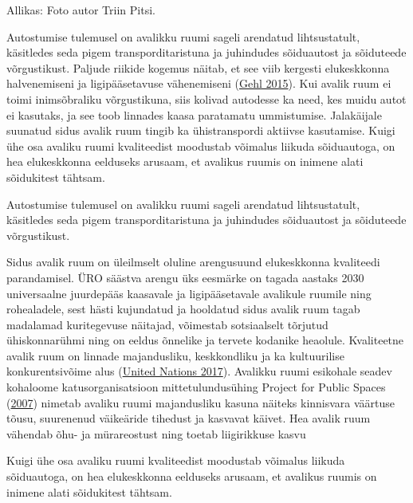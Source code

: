 \documentclass[estonian,]{article}
\begin{document}
\begin{imgsource}
{Allikas:} Foto autor Triin Pitsi.
\end{imgsource}

Autostumise tulemusel on avalikku ruumi sageli arendatud lihtsustatult, käsitledes seda pigem transporditaristuna ja juhindudes sõiduautost ja sõiduteede võrgustikust. Paljude riikide kogemus näitab, et see viib kergesti elukeskkonna halvenemiseni ja ligipääsetavuse vähenemiseni (\protect\hyperlink{Gehl2015}{Gehl 2015}). Kui avalik ruum ei toimi inimsõbraliku võrgustikuna, siis kolivad autodesse ka need, kes muidu autot ei kasutaks, ja see toob linnades kaasa paratamatu ummistumise. Jalakäijale suunatud sidus avalik ruum tingib ka ühistranspordi aktiivse kasutamise. Kuigi ühe osa avaliku ruumi kvaliteedist moodustab võimalus liikuda sõiduautoga, on hea elukeskkonna eelduseks arusaam, et avalikus ruumis on inimene alati sõidukitest tähtsam.

\begin{blockquote-left}
Autostumise tulemusel on avalikku ruumi sageli arendatud lihtsustatult,
käsitledes seda pigem transporditaristuna ja juhindudes sõiduautost ja
sõiduteede võrgustikust.
\end{blockquote-left}

Sidus avalik ruum on üleilmselt oluline arengusuund elukeskkonna kvaliteedi parandamisel. ÜRO säästva arengu üks eesmärke on tagada aastaks 2030 universaalne juurdepääs kaasavale ja ligipääsetavale avalikule ruumile ning rohealadele, sest hästi kujundatud ja hooldatud sidus avalik ruum tagab madalamad kuritegevuse näitajad, võimestab sotsiaalselt tõrjutud ühiskonnarühmi ning on eeldus õnnelike ja tervete kodanike heaolule. Kvaliteetne avalik ruum on linnade majandusliku, keskkondliku ja ka kultuurilise konkurentsivõime alus (\protect\hyperlink{United2017}{United Nations 2017}). Avalikku ruumi esikohale seadev kohaloome katusorganisatsioon mittetulundusühing Project for Public Spaces (\protect\hyperlink{Project2007}{2007}) nimetab avaliku ruumi majandusliku kasuna näiteks kinnisvara väärtuse tõusu, suurenenud väikeäride tihedust ja kasvavat käivet. Hea avalik ruum vähendab õhu- ja mürareostust ning toetab liigirikkuse kasvu

\begin{blockquote-right}
Kuigi ühe osa avaliku ruumi kvaliteedist moodustab võimalus liikuda
sõiduautoga, on hea elukeskkonna eelduseks arusaam, et avalikus ruumis
on inimene alati sõidukitest tähtsam.
\end{blockquote-right}
\end{document}
